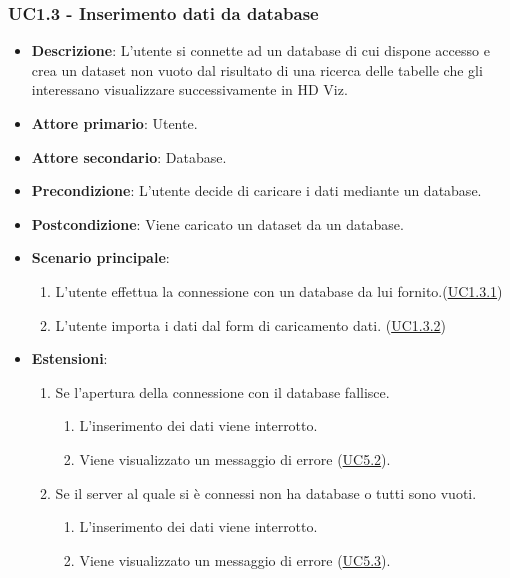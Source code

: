 \subsubsection{UC1.3 - Inserimento dati da database}
\label{ssub:uc1.3}
\begin{itemize}
    \item \textbf{Descrizione}: L'utente si connette ad un database di cui dispone accesso e 
                                crea un dataset non vuoto dal risultato di una ricerca delle tabelle che gli interessano
                                visualizzare successivamente in HD Viz.
    \item \textbf{Attore primario}: Utente.
    
    \item \textbf{Attore secondario}: Database.
    
    \item \textbf{Precondizione}:   L'utente decide di caricare i dati mediante un database. 
    \item \textbf{Postcondizione}:  Viene caricato un dataset da un database. 

	\item \textbf{Scenario principale}:
		\begin{enumerate}
			\item L'utente effettua la connessione con un database da lui fornito.(\hyperref[par:uc1.3.1]{UC1.3.1})
			\item L'utente importa i dati dal form di caricamento dati. (\hyperref[par:uc1.3.2]{UC1.3.2})
        \end{enumerate}

    \item \textbf{Estensioni}:
    \begin{enumerate}
        \item Se l'apertura della connessione con il database fallisce.
        \begin{enumerate}
            \item L'inserimento dei dati viene interrotto.
            \item Viene visualizzato un messaggio di errore (\hyperref[ssub:uc5.2]{UC5.2}).
        \end{enumerate}

        \item Se il server al quale si è connessi non ha database o tutti sono vuoti.
        \begin{enumerate}
            \item L'inserimento dei dati viene interrotto.
            \item Viene visualizzato un messaggio di errore (\hyperref[ssub:uc5.3]{UC5.3}).
        \end{enumerate}


\end{enumerate}
\end{itemize}
